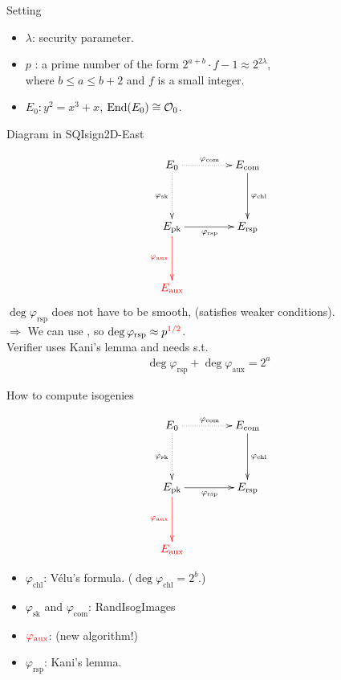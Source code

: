 \begin{frame}{Setting}
    \begin{itemize}
        \setlength{\itemsep}{10pt}
        \item $\lambda$: security parameter.
        \item $p$ : a prime number of the form $2^{a + b} \cdot f - 1 \approx 2^{2\lambda}$,\\[3pt]
                where $b \leq a \leq b + 2$ and $f$ is a small integer.
        \item $E_0 : y^2 = x^3 + x$, $\mathrm{End}(E_0) \cong \mathcal{O}_0$.
    \end{itemize}
\end{frame}

\begin{frame}{Diagram in SQIsign2D-East}

    \vspace{-10pt}
    {\large
    $$
        \xymatrix@C=40pt@R=40pt{
            E_0 \ar@{..>}[r]^{\varphi_\mathrm{com}} \ar@{..>}[d]_{\varphi_\mathrm{sk}} & E_\mathrm{com} \ar[d]^{\varphi_\mathrm{chl}} \\
            E_\mathrm{pk} \ar[r]_{\varphi_\mathrm{rsp}} \ar@[red][d]_{\red{\varphi_\mathrm{aux}}} & E_\mathrm{rsp}\\
            \red{E_\mathrm{aux}} & 
        }
    $$
    }
    $\deg\varphi_\mathrm{rsp}$ does not have to be smooth, (satisfies weaker conditions).\\[3pt]
    \quad $\Rightarrow$ We can use , so $\deg\varphi_\mathrm{rsp} \approx p^{\textcolor{red}{1/2}}$.\\[3pt]
    \quad \hphantom{$\Rightarrow$}
    Verifier uses Kani's lemma and needs  s.t.
    \begin{align*}
        \deg\varphi_\mathrm{rsp} + \deg\varphi_\mathrm{aux} = 2^a
    \end{align*}
\end{frame}

\begin{frame}{How to compute isogenies}

    \vspace{-10pt}
    {\large
    $$
        \xymatrix@C=40pt@R=40pt{
            E_0 \ar@{..>}[r]^{\varphi_\mathrm{com}} \ar@{..>}[d]_{\varphi_\mathrm{sk}} & E_\mathrm{com} \ar[d]^{\varphi_\mathrm{chl}} \\
            E_\mathrm{pk} \ar[r]_{\varphi_\mathrm{rsp}} \ar@[red][d]_{\red{\varphi_\mathrm{aux}}} & E_\mathrm{rsp}\\
            \red{E_\mathrm{aux}} & 
        }
    $$
    }

    \begin{itemize}
        \item $\varphi_\mathrm{chl}$: V\'elu's formula. ($\deg\varphi_\mathrm{chl} = 2^b$.)
        \item $\varphi_\mathrm{sk}$ and $\varphi_\mathrm{com}$: RandIsogImages
        \item $\textcolor{red}{\varphi_\mathrm{aux}}$:  (new algorithm!)
        \item $\varphi_\mathrm{rsp}$: Kani's lemma.
    \end{itemize}
\end{frame}